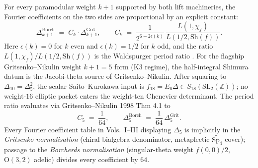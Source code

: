\begin{remark}
\label{rem:concord-shimura-waldspurger-bridge}
%
%
%
For every paramodular weight $k + 1$ supported by both lift
machineries, the Fourier coefficients on the two sides are
proportional by an explicit constant:
\begin{equation}
\label{eq:concord-grit-borch-conversion}
 \Delta_{k+1}^{\mathrm{Borch}}
 \;=\;
 C_{k} \cdot \Delta_{k+1}^{\mathrm{Grit}},
 \qquad
 C_{k} \;=\; \frac{1}{2^{6-2\epsilon(k)}}\,
 \frac{L(1, \chi_f)}{L(1/2, \mathrm{Sh}(f))}.
\end{equation}
Here $\epsilon(k) = 0$ for $k$ even and $\epsilon(k) = 1/2$ for $k$
odd, and the ratio $L(1, \chi_f)/L(1/2, \mathrm{Sh}(f))$ is the
Waldspurger period ratio
\cite{Waldspurger81}. For the
flagship Gritsenko--Nikulin weight $k+1 = 5$ form (K3 regime),
the half-integral Shimura datum is the Jacobi-theta source of
Gritsenko--Nikulin.  After squaring to
$\Delta_{10}=\Delta_5^2$, the scalar Saito--Kurokawa input is
$f_{18}=E_6\Delta\in S_{18}(\mathrm{SL}_2(\mathbb Z))$; no
weight-$16$ elliptic packet enters the weight-ten Chenevier
determinant. The period ratio evaluates via Gritsenko--Nikulin 1998
Thm 4.1 to
\begin{equation}
\label{eq:concord-grit-borch-C5}
 C_{5} \;=\; \frac{1}{64},
 \qquad
 \Delta_5^{\mathrm{Borch}}
 \;=\; \frac{1}{64}\,\Delta_5^{\mathrm{Grit}}.
\end{equation}
Every Fourier coefficient table in Vols.~I--III displaying
$\Delta_5$ is implicitly in the \emph{Gritsenko normalisation}
(chiral-bialgebra denominator, metaplectic $\widetilde{\mathrm{Sp}_4}$
cover); passage to the \emph{Borcherds normalisation}
(singular-theta weight $f(0,0)/2$, $\mathrm{O}(3,2)$ adelic) divides
every coefficient by $64$.
\end{remark}

